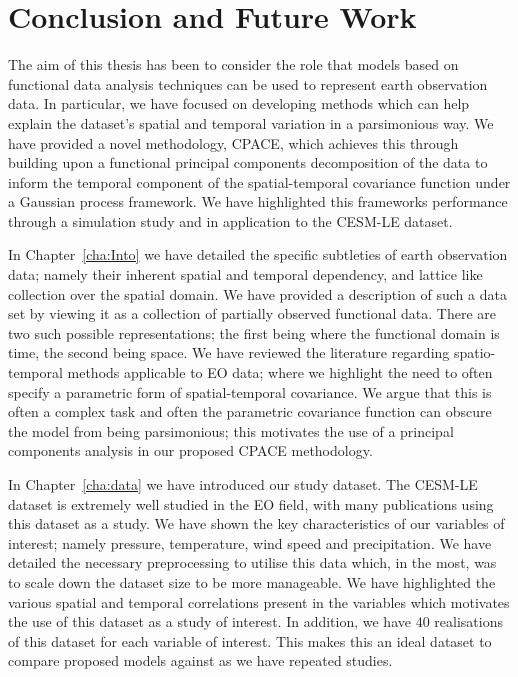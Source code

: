
\chapter{Conclusion and Future Work\label{cha:conclusions}}  %

\ifpdf
    \graphicspath{{Chapter9/Figs/Raster/}{Chapter9/Figs/PDF/}{Chapter9/Figs/}}
\else
    \graphicspath{{Chapter9/Figs/Vector/}{Chapter9/Figs/}}
\fi
The aim of this thesis has been to consider the role that models based on functional data analysis techniques can be used to represent earth observation data.
In particular, we have focused on developing methods which can help explain the dataset's spatial and temporal variation in a parsimonious way.
We have provided a novel methodology, CPACE, which achieves this through building upon a functional principal components decomposition of the data to inform the temporal component of the spatial-temporal covariance function under a Gaussian process framework.
We have highlighted this frameworks performance through a simulation study and in application to the CESM-LE dataset. 

In Chapter~\ref{cha:Into} we have detailed the specific subtleties of earth observation data; namely their inherent spatial and temporal dependency, and lattice like collection over the spatial domain.
We have provided a description of such a data set by viewing it as a collection of partially observed functional data.
There are two such possible representations; the first being where the functional domain is time, the second being space.
We have reviewed the literature regarding spatio-temporal methods applicable to EO data; where we highlight the need to often specify a parametric form of spatial-temporal covariance.
We argue that this is often a complex task and often the parametric covariance function can obscure the model from being parsimonious; this motivates the use of a principal components analysis in our proposed CPACE methodology.

In Chapter~\ref{cha:data} we have introduced our study dataset.
The CESM-LE dataset is extremely well studied in the EO field, with many publications using this dataset as a study.
We have shown the key characteristics of our variables of interest; namely pressure, temperature, wind speed and precipitation.
We have detailed the necessary preprocessing to utilise this data which, in the most, was to scale down the dataset size to be more manageable.
We have highlighted the various spatial and temporal correlations present in the variables which motivates the use of this dataset as a study of interest.
In addition, we have $40$ realisations of this dataset for each variable of interest.
This makes this an ideal dataset to compare proposed models against as we have repeated studies.

